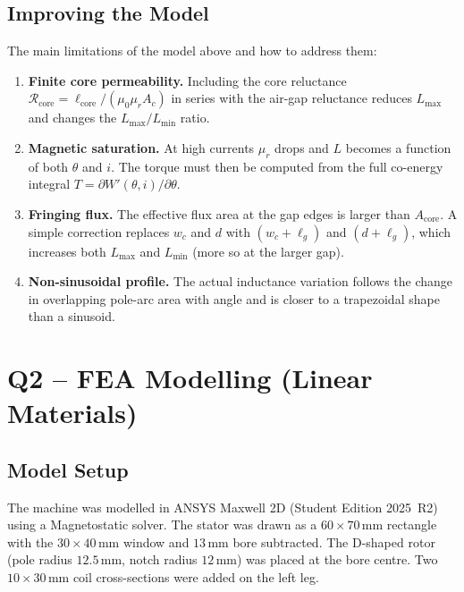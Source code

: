 \documentclass[12pt,a4paper]{article}
\newcommand{\unit}[1]{\,\mathrm{#1}}
\begin{document}
\subsection{Improving the Model}
\label{sec:improve}

The main limitations of the model above and how to address them:

\begin{enumerate}
  \item \textbf{Finite core permeability.} Including the core
        reluctance $\mathcal{R}_{\mathrm{core}} =
        \ell_{\mathrm{core}}/(\mu_0\mu_r A_c)$ in series with the
        air-gap reluctance reduces $L_{\max}$ and changes the
        $L_{\max}/L_{\min}$ ratio.

  \item \textbf{Magnetic saturation.} At high currents $\mu_r$ drops
        and $L$ becomes a function of both $\theta$ and $i$.
        The torque must then be computed from the full co-energy
        integral $T = \partial W'(\theta,i)/\partial\theta$.

  \item \textbf{Fringing flux.} The effective flux area at the gap
        edges is larger than $A_{\mathrm{core}}$.  A simple correction
        replaces $w_c$ and $d$ with $(w_c+\ell_g)$ and $(d+\ell_g)$,
        which increases both $L_{\max}$ and $L_{\min}$ (more so at the
        larger gap).

  \item \textbf{Non-sinusoidal profile.} The actual inductance
        variation follows the change in overlapping pole-arc area with
        angle and is closer to a trapezoidal shape than a sinusoid.
        
\end{enumerate}

\section{Q2 -- FEA Modelling (Linear Materials)}

\subsection{Model Setup}

The machine was modelled in ANSYS Maxwell 2D (Student Edition 2025~R2)
using a Magnetostatic solver.  The stator was drawn as a
$60\times70\unit{mm}$ rectangle with the $30\times40\unit{mm}$ window
and $13\unit{mm}$ bore subtracted.  The D-shaped rotor (pole radius
$12.5\unit{mm}$, notch radius $12\unit{mm}$) was placed at the bore
centre.  Two $10\times30\unit{mm}$ coil cross-sections were added on the
left leg.
\end{document}
